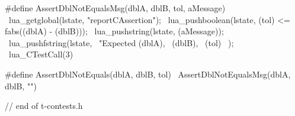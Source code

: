 \stopTestSuite

\startTestSuite[assertDblNotEqals]

\startCHeader
#define AssertDblNotEqualsMsg(dblA, dblB, tol, aMessage)         \
  lua_getglobal(lstate, "reportCAssertion");                     \
  lua_pushboolean(lstate, (tol) <= fabs((dblA) - (dblB)));       \
  lua_pushstring(lstate, (aMessage));                            \
  lua_pushfstring(lstate,                                        \
      "Expected %
      (dblA),                                                    \
      (dblB),                                                    \
      (tol)                                                      \
    );                                                           \
  lua_CTestCall(3)

#define AssertDblNotEquals(dblA, dblB, tol) \
  AssertDblNotEqualsMsg(dblA, dblB, "")

// end of t-contests.h
\stopCHeader

\stopTestSuite
